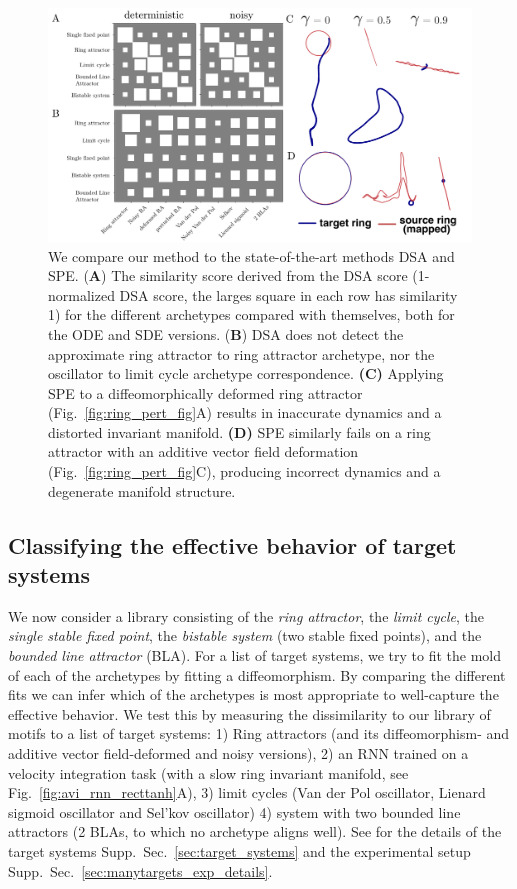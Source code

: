 \documentclass{article}
\theoremstyle{definition} \newtheorem{definition}{Definition}  \newtheorem{example}{Example}
\theoremstyle{remark} \newtheorem{remark}{Remark}
\newcounter{ct}
\begin{document}
\begin{figure}[tbhp]
    \centering
    \includegraphics[width=0.9\linewidth]{dsa_spe}
    \caption{We compare our method to the state-of-the-art methods DSA\citep{ostrow2024beyond} and SPE\citep{friedman2025characterizing}.
      (\textbf{A}) The similarity score derived from the DSA score (1-normalized DSA score, the larges square in each row has similarity 1) for the different archetypes compared with themselves, both for the ODE and SDE versions.
        (\textbf{B}) DSA does not detect the approximate ring attractor to ring attractor archetype, nor the oscillator to limit cycle archetype correspondence.
\textbf{(C)} Applying SPE to a diffeomorphically deformed ring attractor (Fig.~\ref{fig:ring_pert_fig}A) results in inaccurate dynamics and a distorted invariant manifold.  
\textbf{(D)} SPE similarly fails on a ring attractor with an additive vector field deformation (Fig.~\ref{fig:ring_pert_fig}C), producing incorrect dynamics and a degenerate manifold structure.
    }
    \label{fig:dsa_spe}
\end{figure}


\subsection{Classifying the effective behavior of target systems}\label{sec:target_demonstrations}
We now consider a library consisting of the \emph{ring attractor}, the \emph{limit cycle}, the \emph{single stable fixed point}, the \emph{bistable system} (two stable fixed points), and the \emph{bounded line attractor} (BLA).
For a list of target systems, we try to fit the mold of each of the archetypes by fitting a diffeomorphism.
By comparing the different fits we can infer which of the archetypes is most appropriate to well-capture the effective behavior.
We test this by measuring the dissimilarity to our library of motifs to a list of target systems:
1) Ring attractors (and its diffeomorphism- and additive vector field-deformed and noisy versions),
2) an RNN trained on a velocity integration task (with a slow ring invariant manifold, see Fig.~\ref{fig:avi_rnn_recttanh}A),
3) limit cycles (Van der Pol oscillator, Lienard sigmoid oscillator and Sel'kov oscillator)
4) system with two bounded line attractors (2 BLAs, to which no archetype aligns well).
See for the details of the target systems Supp.~Sec.~\ref{sec:target_systems} and the experimental setup Supp.~Sec.~\ref{sec:manytargets_exp_details}.
\end{document}
